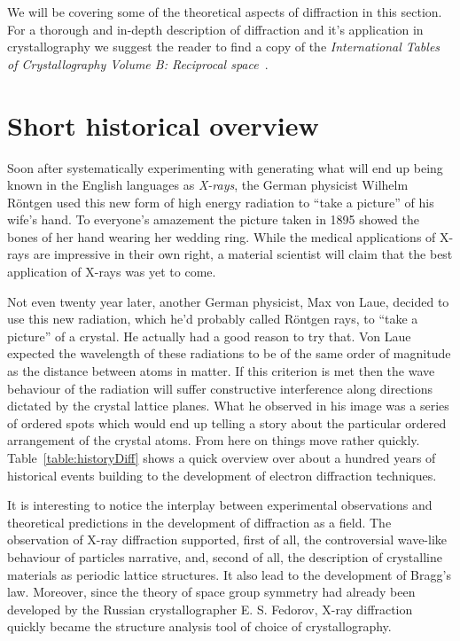 We will be covering some of the theoretical aspects of diffraction in this section. For a thorough and in-depth description of diffraction and it's application in crystallography we suggest the reader to find a copy of the \emph{International Tables of Crystallography Volume B: Reciprocal space}~\cite{IntTableCrysBX, IntTableCrysBe}. 


\section{Short historical overview}
\label{sec:history}
Soon after systematically experimenting with generating what will end up being known in the English languages as \textit{X-rays}, the German physicist Wilhelm R{\"o}ntgen used this new form of high energy radiation to ``take a picture'' of his wife’s hand. To everyone’s amazement the picture taken in 1895 showed the bones of her hand wearing her wedding ring. While the medical applications of X-rays are impressive in their own right, a material scientist will claim that the best application of X-rays was yet to come.

Not even twenty year later, another German physicist, Max von Laue, decided to use this new radiation, which he'd probably called R{\"o}ntgen rays,  to ``take a picture'' of a crystal. He actually had a good reason to try that. Von Laue expected the wavelength of these radiations to be of the same order of magnitude as the distance between atoms in matter. If this criterion is met then the wave behaviour of the radiation will suffer constructive interference along directions dictated by the crystal lattice planes. What he observed in his image was a series of ordered spots which would end up telling a story about the particular ordered arrangement of the crystal atoms. From here on things move rather quickly. Table~\ref{table:historyDiff} shows a quick overview over about a hundred years of historical events building to the development of electron diffraction techniques.

It is interesting to notice the interplay between experimental observations and theoretical predictions in the development of diffraction as a field. The observation of X-ray diffraction supported, first of all, the controversial wave-like behaviour of particles narrative, and, second of all, the description of crystalline materials as periodic lattice structures. It also lead to the development of Bragg's law. Moreover, since the theory of space group symmetry had already been developed by the Russian crystallographer E. S. Fedorov, X-ray diffraction quickly became the structure analysis tool of choice of crystallography.









